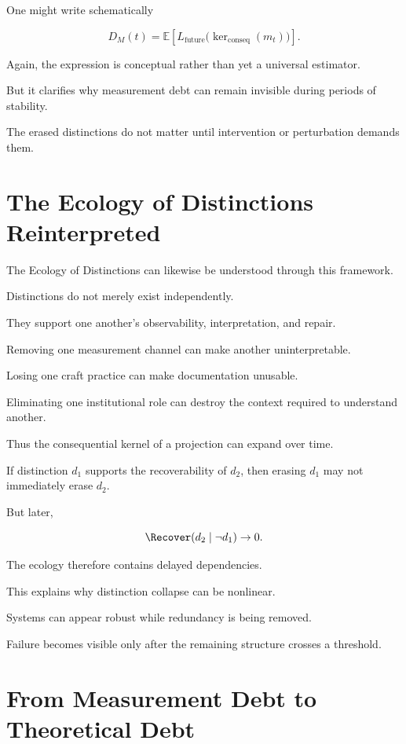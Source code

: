 \documentclass[11pt]{article}
\theoremstyle{remark}
\begin{document}
One might write schematically

\begin{equation}
D_M(t)
=
\mathbb{E}
\left[
L_{\mathrm{future}}
\bigl(
\ker_{\mathrm{conseq}}(m_t)
\bigr)
\right].
\end{equation}

Again, the expression is conceptual rather than yet a universal estimator.

But it clarifies why measurement debt can remain invisible during periods of stability.

The erased distinctions do not matter until intervention or perturbation demands them.

\section{The Ecology of Distinctions Reinterpreted}

The Ecology of Distinctions can likewise be understood through this framework.

Distinctions do not merely exist independently.

They support one another's observability, interpretation, and repair.

Removing one measurement channel can make another uninterpretable.

Losing one craft practice can make documentation unusable.

Eliminating one institutional role can destroy the context required to understand another.

Thus the consequential kernel of a projection can expand over time.

If distinction $d_1$ supports the recoverability of $d_2$, then erasing $d_1$ may not immediately erase $d_2$.

But later,

\begin{equation}
\Recover(d_2\mid \neg d_1)
\rightarrow 0.
\end{equation}

The ecology therefore contains delayed dependencies.

This explains why distinction collapse can be nonlinear.

Systems can appear robust while redundancy is being removed.

Failure becomes visible only after the remaining structure crosses a threshold.

\section{From Measurement Debt to Theoretical Debt}
\end{document}
